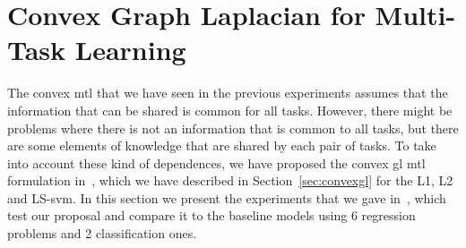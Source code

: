 










\section{Convex Graph Laplacian for Multi-Task Learning}\label{sec:convexgl_experiments}
%
The convex \acrshort{mtl} that we have seen in the previous experiments assumes that the information that can be shared is common for all tasks. However, there might be problems where there is not an information that is common to all tasks, but there are some elements of knowledge that are shared by each pair of tasks. 
%
To take into account these kind of dependences, we have proposed the convex \acrshort{gl} \acrshort{mtl} formulation in~\cite{RuizAD20}, which we have described in Section~\ref{sec:convexgl} for the L1, L2 and LS-\acrshort{svm}.
%
In this section we present the experiments that we gave in~\cite{RuizAD20}, which test our proposal and compare it to the baseline models using \num{6} regression problems and \num{2} classification ones.


